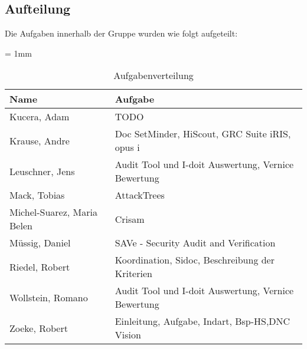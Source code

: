 \subsection{Aufteilung}
Die Aufgaben innerhalb der Gruppe wurden wie folgt aufgeteilt:

\begin{table}[H]
	\sffamily
	\caption{Aufgabenverteilung}
	\tabulinesep = 1mm %
	\centering
		\begin{tabu} to 0.9\textwidth { X[1.7]  X[3] }
		\hline
		\textbf{Name} & \textbf{Aufgabe}\\
		\hline 
		Kucera, Adam & TODO\\

		Krause, Andre & Doc SetMinder, HiScout, GRC Suite iRIS, opus i\\

		Leuschner, Jens & Audit Tool und I-doit Auswertung, Vernice Bewertung \\

		Mack, Tobias & AttackTrees\\

		Michel-Suarez, Maria Belen & Crisam\\

		Müssig, Daniel & SAVe - Security Audit and Verification\\

		Riedel, Robert & Koordination, Sidoc, Beschreibung der Kriterien\\

		Wollstein, Romano & Audit Tool und I-doit Auswertung, Vernice Bewertung\\

		Zoeke, Robert & Einleitung, Aufgabe, Indart, Bsp-HS,DNC Vision\\

	\end{tabu}
\end{table}
